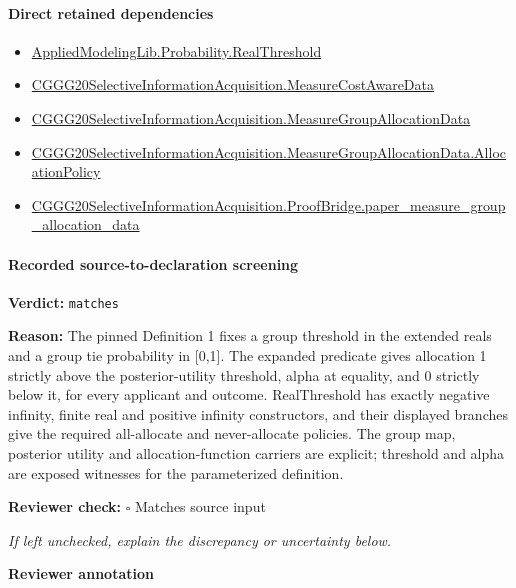 \documentclass[10pt]{article}
\newcommand{\reviewerbox}{%
  \par\noindent\fbox{\parbox{0.96\linewidth}{\rule{0pt}{0.38in}}}\par
}
\newcommand{\reviewmatch}[1]{%
  \par\noindent\textbf{Reviewer check:} $\square$\; #1\par
  \noindent\emph{If left unchecked, explain the discrepancy or uncertainty below.}\par
}
\begin{document}
\paragraph{Direct retained dependencies}
\begin{itemize}\raggedright
\item \hyperlink{governing-declaration-41082d9d716d6171}{Applied\allowbreak{}Modeling\allowbreak{}Lib.\allowbreak{}Probability.\allowbreak{}Real\allowbreak{}Threshold}
\item \hyperlink{governing-declaration-254893ae2d19bfc7}{CGGG20\allowbreak{}Selective\allowbreak{}Information\allowbreak{}Acquisition.\allowbreak{}Measure\allowbreak{}Cost\allowbreak{}Aware\allowbreak{}Data}
\item \hyperlink{governing-declaration-da82fc25816f69f3}{CGGG20\allowbreak{}Selective\allowbreak{}Information\allowbreak{}Acquisition.\allowbreak{}Measure\allowbreak{}Group\allowbreak{}Allocation\allowbreak{}Data}
\item \hyperlink{governing-declaration-ae6a1576674ada0a}{CGGG20\allowbreak{}Selective\allowbreak{}Information\allowbreak{}Acquisition.\allowbreak{}Measure\allowbreak{}Group\allowbreak{}Allocation\allowbreak{}Data.\allowbreak{}Allocation\allowbreak{}Policy}
\item \hyperlink{governing-declaration-8746c73995dc5f78}{CGGG20\allowbreak{}Selective\allowbreak{}Information\allowbreak{}Acquisition.\allowbreak{}Proof\allowbreak{}Bridge.\allowbreak{}paper\_\allowbreak{}measure\_\allowbreak{}group\_\allowbreak{}allocation\_\allowbreak{}data}
\end{itemize}
\paragraph{Recorded source-to-declaration screening}
\textbf{Verdict:} \texttt{matches}
\\
{\raggedright
\textbf{Reason:} The pinned Definition 1 fixes a group threshold in the extended reals and a group tie probability in [0,1].\allowbreak{} The expanded predicate gives allocation 1 strictly above the posterior-\allowbreak{}utility threshold, alpha at equality, and 0 strictly below it, for every applicant and outcome.\allowbreak{} RealThreshold has exactly negative infinity, finite real and positive infinity constructors, and their displayed branches give the required all-\allowbreak{}allocate and never-\allowbreak{}allocate policies.\allowbreak{} The group map, posterior utility and allocation-\allowbreak{}function carriers are explicit;\allowbreak{} threshold and alpha are exposed witnesses for the parameterized definition.\allowbreak{}
\par}
\reviewmatch{Matches source input}
\noindent\textbf{Reviewer annotation}\par
\reviewerbox
\clearpage
\hypertarget{paper-prerequisite-9db3d25783c683bb}{}
\end{document}
